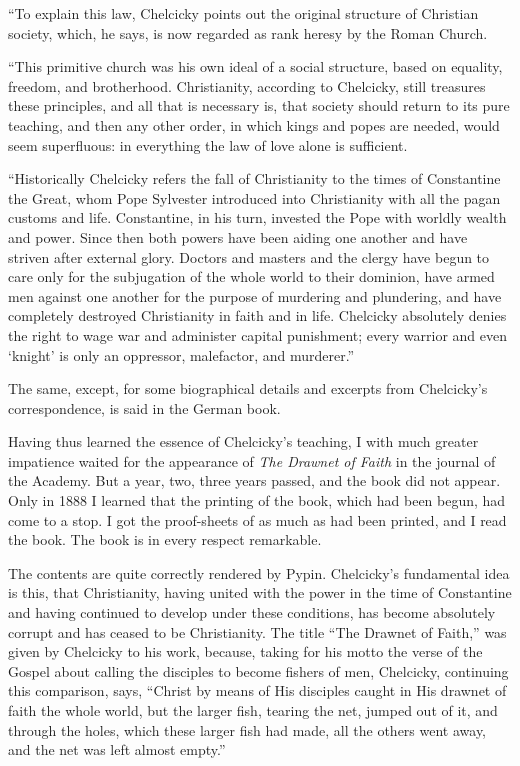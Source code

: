 \documentclass{book}
\begin{document}
“To explain this law, Chelcicky points out the original structure of Christian society, which, he says, is now regarded as rank heresy by the Roman Church.

“This primitive church was his own ideal of a social structure, based on equality, freedom, and brotherhood. Christianity, according to Chelcicky, still treasures these principles, and all that is necessary is, that society should return to its pure teaching, and then any other order, in which kings and popes are needed, would seem superfluous: in everything the law of love alone is sufficient.

“Historically Chelcicky refers the fall of Christianity to the times of Constantine the Great, whom Pope Sylvester introduced into Christianity with all the pagan customs and life. Constantine, in his turn, invested the Pope with worldly wealth and power. Since then both powers have been aiding one another and have striven after external glory. Doctors and masters and the clergy have begun to care only for the subjugation of the whole world to their dominion, have armed men against one another for the purpose of murdering and plundering, and have completely destroyed Christianity in faith and in life. Chelcicky absolutely denies the right to wage war and administer capital punishment; every warrior and even ‘knight’ is only an oppressor, malefactor, and murderer.”

The same, except, for some biographical details and excerpts from Chelcicky’s correspondence, is said in the German book.

Having thus learned the essence of Chelcicky’s teaching, I with much greater impatience waited for the appearance of \emph{The Drawnet of Faith} in the journal of the Academy. But a year, two, three years passed, and the book did not appear. Only in 1888 I learned that the printing of the book, which had been begun, had come to a stop. I got the proof-sheets of as much as had been printed, and I read the book. The book is in every respect remarkable.

The contents are quite correctly rendered by Pypin. Chelcicky’s fundamental idea is this, that Christianity, having united with the power in the time of Constantine and having continued to develop under these conditions, has become absolutely corrupt and has ceased to be Christianity. The title “The Drawnet of Faith,” was given by Chelcicky to his work, because, taking for his motto the verse of the Gospel about calling the disciples to become fishers of men, Chelcicky, continuing this comparison, says, “Christ by means of His disciples caught in His drawnet of faith the whole world, but the larger fish, tearing the net, jumped out of it, and through the holes, which these larger fish had made, all the others went away, and the net was left almost empty.”
\end{document}
